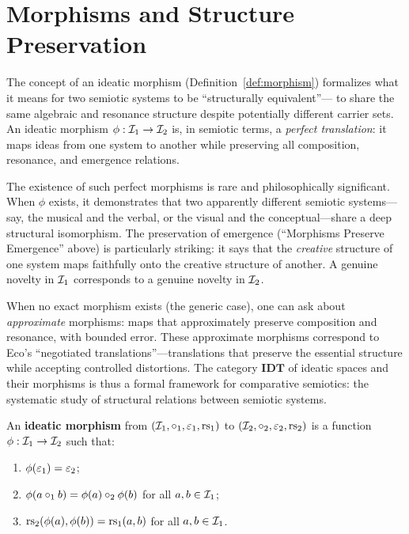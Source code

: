 \section{Morphisms and Structure Preservation}

\begin{interpretation}\label{interp:ch7:morphisms_translation}
The concept of an ideatic morphism (Definition~\ref{def:morphism}) formalizes
what it means for two semiotic systems to be ``structurally equivalent''---
to share the same algebraic and resonance structure despite potentially
different carrier sets. An ideatic morphism $\phi : \mathcal{I}_1 \to \mathcal{I}_2$ is,
in semiotic terms, a \emph{perfect translation}: it maps ideas from one
system to another while preserving all composition, resonance, and
emergence relations.

The existence of such perfect morphisms is rare and philosophically
significant. When $\phi$ exists, it demonstrates that two apparently
different semiotic systems---say, the musical and the verbal, or the
visual and the conceptual---share a deep structural isomorphism. The
preservation of emergence (``Morphisms Preserve Emergence'' above)
is particularly striking: it says that the \emph{creative} structure of
one system maps faithfully onto the creative structure of another. A
genuine novelty in $\mathcal{I}_1$ corresponds to a genuine novelty in $\mathcal{I}_2$.

When no exact morphism exists (the generic case), one can ask about
\emph{approximate} morphisms: maps that approximately preserve
composition and resonance, with bounded error. These approximate
morphisms correspond to Eco's ``negotiated translations''---translations
that preserve the essential structure while accepting controlled
distortions. The category $\mathbf{IDT}$ of ideatic spaces and their
morphisms is thus a formal framework for comparative semiotics: the
systematic study of structural relations between semiotic systems.
\end{interpretation}

\begin{definition}\label{def:morphism}
An \textbf{ideatic morphism} from $(\mathcal{I}_1, \circ_1, \varepsilon_1, \mathrm{rs}_1)$
to $(\mathcal{I}_2, \circ_2, \varepsilon_2, \mathrm{rs}_2)$ is a function $\phi : \mathcal{I}_1 \to
\mathcal{I}_2$ such that:
\begin{enumerate}
    \item $\phi(\varepsilon_1) = \varepsilon_2$;
    \item $\phi(a \circ_1 b) = \phi(a) \circ_2 \phi(b)$ for all
          $a, b \in \mathcal{I}_1$;
    \item $\mathrm{rs}_2(\phi(a), \phi(b)) = \mathrm{rs}_1(a, b)$ for all
          $a, b \in \mathcal{I}_1$.
\end{enumerate}
\end{definition}


